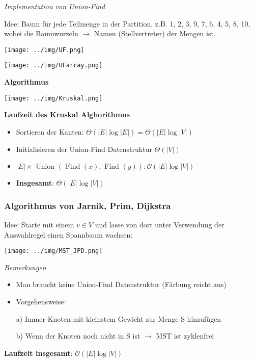 \documentclass[german]{latex4ei/latex4ei_sheet}
\newcommand\tab[1][.3cm]{\hspace*{#1}}
\begin{document}
\begin{sectionbox}
\textit{Implementation von Union-Find}\par
Idee: Baum für jede Teilmenge in der Partition, z.B. {{1, 2, 3, 9}, {7, 6, 4}, {5, 8}, {10}}, wobei die Baumwurzeln $\to$ Namen (Stellvertreter) der Mengen ist.\par\smallskip
\begin{center}
    \texttt{[image: ../img/UF.png]}\par\smallskip
    \texttt{[image: ../img/UFarray.png]}\par\smallskip
\end{center}

\textbf{Algorithmus}\par
\texttt{[image: ../img/Kruskal.png]}\par\smallskip

\textbf{Laufzeit des Kruskal Alghorithmus}\par
\begin{itemize}
    \item Sortieren der Kanten: $\Theta(|E| \log |E|)=\Theta(|E| \log |V|)$
    \item Initialisieren der Union-Find Datenstruktur $\Theta(|V|)$
    \item $|E| \times \text { Union }(\text { Find }(x), \text { Find }(y)): \mathcal{O}(|E| \log |V|)$
    \item \textbf{Insgesamt}: $\Theta(|E| \log |V|)$
\end{itemize}%
\end{sectionbox}

\begin{sectionbox}
\subsubsection{Algorithmus von Jarnik, Prim, Dijkstra}\smallskip
Idee: Starte mit einem $v \in V$ und lasse von dort unter Verwendung der Auswahlregel einen Spannbaum wachsen:\par
\texttt{[image: ../img/MST\_JPD.png]}\par\smallskip
\textit{Bemerkungen}\par
\begin{itemize}
    \item Man braucht keine Union-Find Datenstruktur (Färbung reicht aus)
    \item Vorgehensweise:
    \par \tab a) Immer Knoten mit kleinstem Gewicht zur Menge S hinzufügen
    \par \tab b) Wenn der Knoten noch nicht in S ist $\to$ MST ist zyklenfrei
\end{itemize}\par\smallskip
\textbf{Laufzeit insgesamt}: $\mathcal{O}(|E| \log |V|)$
\end{sectionbox}
\end{document}
